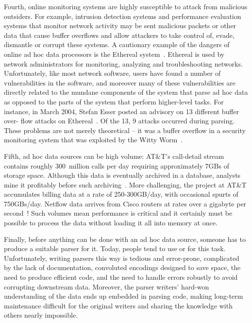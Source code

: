 Fourth, online monitoring systems
are highly susceptible to attack from malicious outsiders.
For example, intrusion detection systems
and performance evaluation systems that monitor network activity 
may be sent malicious packets or other data that cause buffer overflows
and allow attackers to take control of, evade, dismantle or corrupt these
systems.  A cautionary example of the dangers of online ad hoc data
processors is the Ethereal system~\cite{ethereal}. Ethereal is used by network administrators for monitoring, analyzing
and troubleshooting networks. Unfortunately, like most network software, users have found a number of
vulnerabilities in the software, and moreover many of these vulnerabilities are directly related to the mundane
components of the system that parse ad hoc data as opposed to the parts of the system that perform
higher-level tasks. For instance, in March 2004, Stefan Esser posted an advisory on 13 different buffer over-
flow attacks on Ethereal~\cite{etherealvulnerabilities}. Of the 13, 9 attacks occurred during parsing. These problems are not merely theoretical -- it was
a buffer overflow in a security monitoring system that was exploited by the
Witty Worm~\cite{witty}.

Fifth, ad hoc data sources can be high volume:
AT\&T's call-detail stream contains roughly 300~million calls per day
requiring approximately 7GBs of storage space. Although this data is
eventually archived in a database, analysts mine it profitably before
such archiving~\cite{kdd98,kdd99}. More challenging, the \ningaui{}
project at AT\&T accumulates billing data at a rate of 250-300GB/day,
with occasional spurts of 750GBs/day. Netflow data arrives from Cisco
routers at rates over a gigabyte per second~\cite{gigascope}! Such
volumes mean performance is critical and it certainly
must be possible to process the data without loading
it all into memory at once.

Finally, before anything can be done with an ad hoc data source,
someone has to produce a suitable parser for it.  Today, people tend
to use \C{} or \perl{} for this task.  Unfortunately, writing parsers
this way is tedious and error-prone, complicated by the lack of
documentation, convoluted encodings designed to save space, the need
to produce efficient code, and the need to handle errors robustly to
avoid corrupting downstream data.  Moreover, the parser writers'
hard-won understanding of the data ends up embedded in parsing code,
making long-term maintenance difficult for the original writers and
sharing the knowledge with others nearly impossible.

